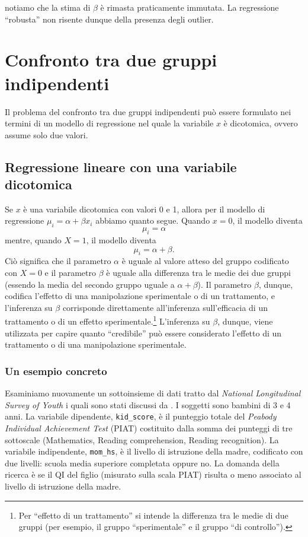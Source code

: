 \documentclass[
  10pt,
  italian,
  a4paper,
  extrafontsizes,onecolumn,openright
  ]{memoir}
\begin{document}
\noindent
notiamo che la stima di \(\beta\) è rimasta praticamente immutata. La regressione ``robusta'' non risente dunque della presenza degli outlier.

\hypertarget{comparison-two-means-stan}{%
\chapter{Confronto tra due gruppi indipendenti}\label{comparison-two-means-stan}}

Il problema del confronto tra due gruppi indipendenti può essere formulato nei termini di un modello di regressione nel quale la variabile \(x\) è dicotomica, ovvero assume solo due valori.

\hypertarget{regressione-lineare-con-una-variabile-dicotomica}{%
\section{Regressione lineare con una variabile dicotomica}\label{regressione-lineare-con-una-variabile-dicotomica}}

Se \(x\) è una variabile dicotomica con valori 0 e 1, allora per il modello di regressione \(\mu_i = \alpha + \beta x_i\) abbiamo quanto segue. Quando \(x=0\), il modello diventa
\[
\mu_i = \alpha
\]
\noindent
mentre, quando \(X=1\), il modello diventa
\[
\mu_i = \alpha + \beta.
\]
\noindent
Ciò significa che il parametro \(\alpha\) è uguale al valore atteso del gruppo codificato con \(X=0\) e il parametro \(\beta\) è uguale alla differenza tra le medie dei due gruppi (essendo la media del secondo gruppo uguale a \(\alpha + \beta\)). Il parametro \(\beta\), dunque, codifica l'effetto di una manipolazione sperimentale o di un trattamento, e l'inferenza su \(\beta\) corrisponde direttamente all'inferenza sull'efficacia di un trattamento o di un effetto sperimentale.\footnote{Per ``effetto di un trattamento'' si intende la differenza tra le medie di due gruppi (per esempio, il gruppo ``sperimentale'' e il gruppo ``di controllo'').} L'inferenza su \(\beta\), dunque, viene utilizzata per capire quanto ``credibile'' può essere considerato l'effetto di un trattamento o di una manipolazione sperimentale.

\hypertarget{un-esempio-concreto}{%
\subsection{Un esempio concreto}\label{un-esempio-concreto}}

Esaminiamo nuovamente un sottoinsieme di dati tratto dal \emph{National Longitudinal Survey of Youth} i quali sono stati discussi da \textcite{gelman2020regression}. I soggetti sono bambini di 3 e 4 anni. La variabile dipendente, \texttt{kid\_score}, è il punteggio totale del \emph{Peabody Individual Achievement Test} (PIAT) costituito dalla somma dei punteggi di tre sottoscale (Mathematics, Reading comprehension, Reading recognition). La variabile indipendente, \texttt{mom\_hs}, è il livello di istruzione della madre, codificato con due livelli: scuola media superiore completata oppure no. La domanda della ricerca è se il QI del figlio (misurato sulla scala PIAT) risulta o meno associato al livello di istruzione della madre.
\end{document}
